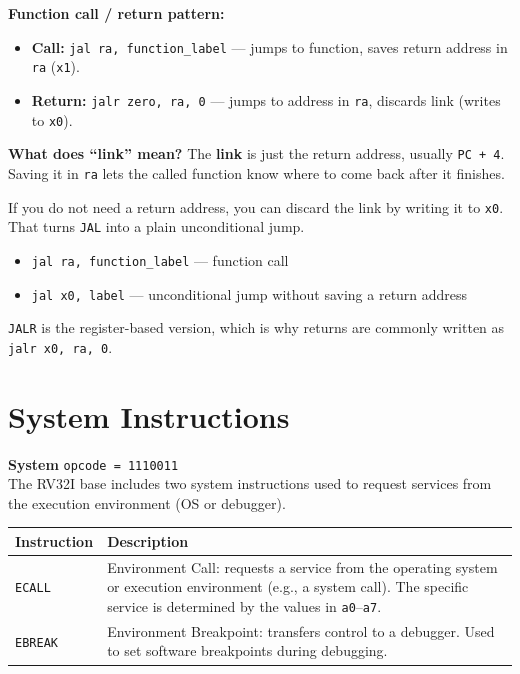 \documentclass[12pt, a4paper, oneside]{book}
\begin{document}
\begin{infobox}
\textbf{\color{accentblue}Function call / return pattern:}
\begin{itemize}
  \item \textbf{Call:} \texttt{jal ra, function\_label} --- jumps to function, saves return address in \texttt{ra} (\texttt{x1}).
  \item \textbf{Return:} \texttt{jalr zero, ra, 0} --- jumps to address in \texttt{ra}, discards link (writes to \texttt{x0}).
\end{itemize}
\end{infobox}

\begin{keybox}
\textbf{\color{gold}What does ``link'' mean?}
The \textbf{link} is just the return address, usually \texttt{PC + 4}. Saving it in \texttt{ra} lets the called function know where to come back after it finishes.

If you do not need a return address, you can discard the link by writing it to \texttt{x0}. That turns \texttt{JAL} into a plain unconditional jump.

\begin{itemize}
  \item \texttt{jal ra, function\_label} --- function call
  \item \texttt{jal x0, label} --- unconditional jump without saving a return address
\end{itemize}

\texttt{JALR} is the register-based version, which is why returns are commonly written as \texttt{jalr x0, ra, 0}.
\end{keybox}

\newpage

\section{System Instructions}

\begin{infobox}
\textbf{\color{gold}\Large System} \hfill \texttt{opcode = 1110011}\\[6pt]
The RV32I base includes two system instructions used to request services from the execution environment (OS or debugger).
\end{infobox}

\begin{center}
\renewcommand{\arraystretch}{1.25}
\begin{tabular}{l p{10cm}}
\toprule
\textbf{\color{purple}Instruction} & \textbf{\color{purple}Description} \\
\midrule
\texttt{ECALL}  & Environment Call: requests a service from the operating system or execution environment (e.g., a system call). The specific service is determined by the values in \texttt{a0}--\texttt{a7}. \\[4pt]
\texttt{EBREAK} & Environment Breakpoint: transfers control to a debugger. Used to set software breakpoints during debugging. \\
\bottomrule
\end{tabular}
\end{center}
\end{document}
